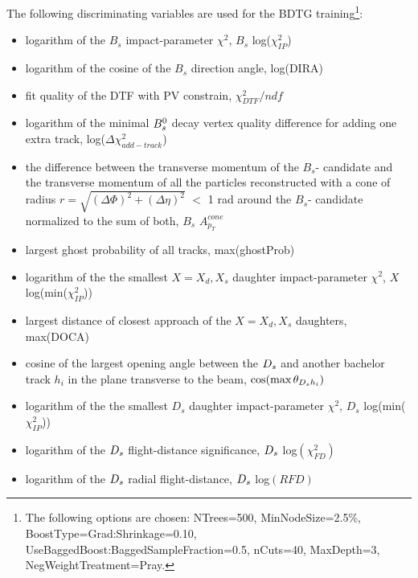 The following discriminating variables are used for the BDTG training\footnote{
The following options are chosen: 
NTrees=500, MinNodeSize=2.5\%, BoostType=Grad:Shrinkage=0.10, UseBaggedBoost:BaggedSampleFraction=0.5, nCuts=40, MaxDepth=3, 
NegWeightTreatment=Pray.
}:
\begin{itemize} 

	\item logarithm of the $B_s$ impact-parameter $\chi^{2}$, $B_{s}$ log($\chi^{2}_{IP}$)

	\item logarithm of the cosine of the $B_s$ direction angle, log(DIRA)
	
	\item fit quality of the DTF with PV constrain, $\chi^2_{DTF}/ndf$
	
	\item logarithm of the minimal ${{B}^0_{s}}$ decay vertex quality difference for adding one extra track,  log($\Delta\chi^2_{add-track}$)
	
	\item  the difference between the transverse momentum
	 of the $B_s$- candidate and the transverse momentum of all the particles reconstructed
	 with a cone of radius $r = \sqrt{(\Delta\Phi)^{2} + (\Delta\eta)^{2}}$ $<$ 1 rad around the $B_s$- candidate
	 normalized to the sum of both, $B_s$ $A^{cone}_{p_T}$ 
		
	\item largest ghost probability of all tracks, max(ghostProb)

	\item logarithm of the the smallest $X=X_d,X_s$ daughter impact-parameter $\chi^{2}$,  $X$ log(min($\chi^{2}_{IP}$))

	\item largest distance of closest approach of the $X=X_d,X_s$ daughters, max(DOCA)

	\item cosine of the largest opening angle between the ${{D}_{s}}$ and another bachelor track $h_i$ in the plane transverse to the beam, $\cos(\text{max} \, \theta_{{{D}_{s}} h_{i}})$
	
	\item logarithm of the the smallest $D_{s}$ daughter impact-parameter $\chi^{2}$,  $D_{s}$ log(min($\chi^{2}_{IP}$))

	\item logarithm of the ${{D}_{s}}$ flight-distance significance, ${{D}_{s}}$ log$(\chi^2_{FD})$

	\item logarithm of the ${{D}_{s}}$ radial flight-distance, ${{D}_{s}}$ log$(RFD)$

\end{itemize}
